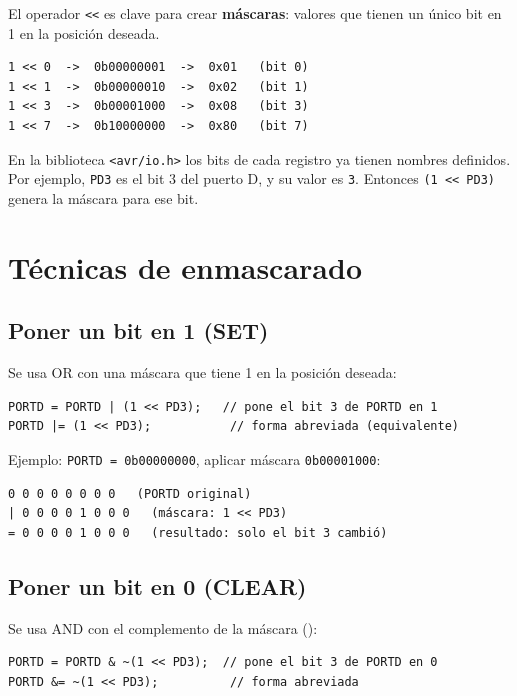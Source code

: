 El operador \texttt{<{}<} es clave para crear \textbf{máscaras}: valores que tienen un
único bit en 1 en la posición deseada.

\begin{lstlisting}[style=estilo-c]
1 << 0  ->  0b00000001  ->  0x01   (bit 0)
1 << 1  ->  0b00000010  ->  0x02   (bit 1)
1 << 3  ->  0b00001000  ->  0x08   (bit 3)
1 << 7  ->  0b10000000  ->  0x80   (bit 7)
\end{lstlisting}

En la biblioteca \texttt{<avr/io.h>} los bits de cada registro ya tienen nombres
definidos. Por ejemplo, \texttt{PD3} es el bit 3 del puerto D, y su valor es
\texttt{3}. Entonces \texttt{(1 <{}< PD3)} genera la máscara para ese bit.

\section{Técnicas de enmascarado}

\subsection{Poner un bit en 1 (SET)}

Se usa OR con una máscara que tiene 1 en la posición deseada:

\begin{lstlisting}[style=estilo-c]
PORTD = PORTD | (1 << PD3);   // pone el bit 3 de PORTD en 1
PORTD |= (1 << PD3);           // forma abreviada (equivalente)
\end{lstlisting}

Ejemplo: \texttt{PORTD = 0b00000000}, aplicar máscara \texttt{0b00001000}:

\begin{lstlisting}[style=estilo-c]
  0 0 0 0 0 0 0 0   (PORTD original)
| 0 0 0 0 1 0 0 0   (máscara: 1 << PD3)
= 0 0 0 0 1 0 0 0   (resultado: solo el bit 3 cambió)
\end{lstlisting}

\subsection{Poner un bit en 0 (CLEAR)}

Se usa AND con el complemento de la máscara (\texttt{}):

\begin{lstlisting}[style=estilo-c]
PORTD = PORTD & ~(1 << PD3);  // pone el bit 3 de PORTD en 0
PORTD &= ~(1 << PD3);          // forma abreviada
\end{lstlisting}

